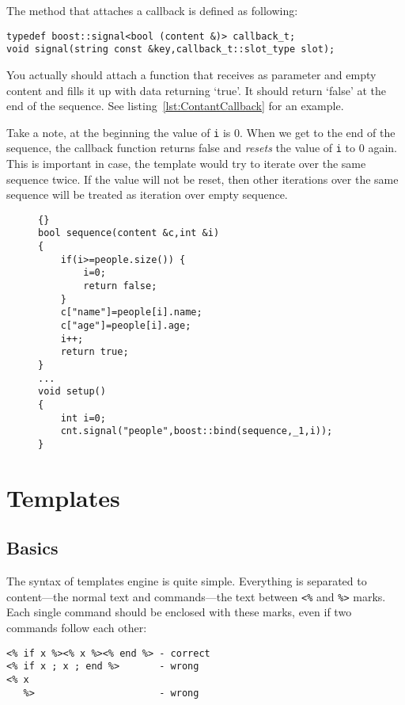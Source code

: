 \documentclass{article}
\newcommand{\tw}[1]{\texttt{#1}}
\begin{document}
The method that attaches a callback is defined as following:

\begin{verbatim}
typedef boost::signal<bool (content &)> callback_t;
void signal(string const &key,callback_t::slot_type slot);
\end{verbatim}

You actually should attach a function that receives as parameter and empty content and fills it up with data returning `true'. It should return `false' at the end of the sequence. See listing~\ref{lst:ContantCallback} for an example.

Take a note, at the beginning the value of \tw{i} is 0. When we get to the end of the sequence, the callback function returns
false and \emph{resets} the value of \tw{i} to 0 again. This is important in case, the template would try to iterate
over the same sequence twice. If the value will not be reset, then other iterations over the same sequence will be
treated as iteration over empty sequence.

\begin{figure}
\begin{lstlisting}[label=lst:ContantCallback,caption=Creating a Sequence With Callback]{}
bool sequence(content &c,int &i)
{
	if(i>=people.size()) {
		i=0;
		return false;
	}
	c["name"]=people[i].name;
	c["age"]=people[i].age;
	i++;
	return true;
}
...
void setup()
{
	int i=0;
	cnt.signal("people",boost::bind(sequence,_1,i));
}
\end{lstlisting}

\end{figure}

\section{Templates}

\subsection{Basics}
The syntax of templates engine is quite simple. Everything is separated to content---the normal text and commands---the
text between \verb+<%+ and \verb+%>+ marks. Each single command should be enclosed with these marks, even if two commands follow each other:

\begin{verbatim}
<% if x %><% x %><% end %> - correct
<% if x ; x ; end %>       - wrong
<% x
   %>                      - wrong
\end{verbatim}
\end{document}
